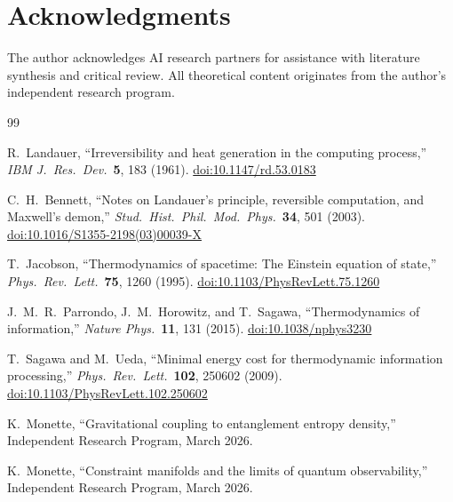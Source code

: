\documentclass[12pt,letterpaper]{article}
\theoremstyle{plain}
\theoremstyle{definition}
\theoremstyle{remark}
\begin{document}
\section*{Acknowledgments}
The author acknowledges AI research partners for assistance with literature synthesis and
critical review.  All theoretical content originates from the author's independent research
program.


\begin{thebibliography}{99}

R.~Landauer,
``Irreversibility and heat generation in the computing process,''
\textit{IBM J.\ Res.\ Dev.}\ \textbf{5}, 183 (1961).
\href{https://doi.org/10.1147/rd.53.0183}{doi:10.1147/rd.53.0183}

C.~H.~Bennett,
``Notes on Landauer's principle, reversible computation, and Maxwell's demon,''
\textit{Stud.\ Hist.\ Phil.\ Mod.\ Phys.}\ \textbf{34}, 501 (2003).
\href{https://doi.org/10.1016/S1355-2198(03)00039-X}{doi:10.1016/S1355-2198(03)00039-X}

T.~Jacobson,
``Thermodynamics of spacetime: The Einstein equation of state,''
\textit{Phys.\ Rev.\ Lett.}\ \textbf{75}, 1260 (1995).
\href{https://doi.org/10.1103/PhysRevLett.75.1260}{doi:10.1103/PhysRevLett.75.1260}

J.~M.~R.~Parrondo, J.~M.~Horowitz, and T.~Sagawa,
``Thermodynamics of information,''
\textit{Nature Phys.}\ \textbf{11}, 131 (2015).
\href{https://doi.org/10.1038/nphys3230}{doi:10.1038/nphys3230}

T.~Sagawa and M.~Ueda,
``Minimal energy cost for thermodynamic information processing,''
\textit{Phys.\ Rev.\ Lett.}\ \textbf{102}, 250602 (2009).
\href{https://doi.org/10.1103/PhysRevLett.102.250602}{doi:10.1103/PhysRevLett.102.250602}

K.~Monette,
``Gravitational coupling to entanglement entropy density,''
Independent Research Program, March 2026.

K.~Monette,
``Constraint manifolds and the limits of quantum observability,''
Independent Research Program, March 2026.

\end{thebibliography}
\end{document}
